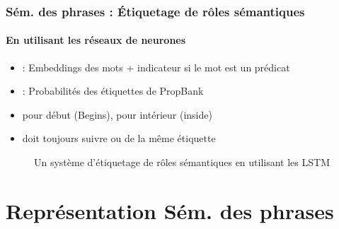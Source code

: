 \documentclass[xcolor=table]{beamer}
\begin{document}
\begin{frame}
	\frametitle{Sém. des phrases : Étiquetage de rôles sémantiques}
	\framesubtitle{En utilisant les réseaux de neurones}

	\begin{minipage}{.48\textwidth}
		\begin{itemize}
			\item {} : Embeddings des mots + indicateur si le mot est un prédicat 
			\item {} : Probabilités des étiquettes de PropBank 
			\item {} pour début (Begins),  pour intérieur (inside)
			\item {} doit toujours suivre  ou  de la même étiquette
		\end{itemize}
	\end{minipage}
	\begin{minipage}{.5\textwidth}
		\begin{figure}
			\caption{Un système d'étiquetage de rôles sémantiques en utilisant les LSTM \cite{2017-he-al}}
		\end{figure}
	\end{minipage}
	
\end{frame}

\section{Représentation Sém. des phrases}
\end{document}
